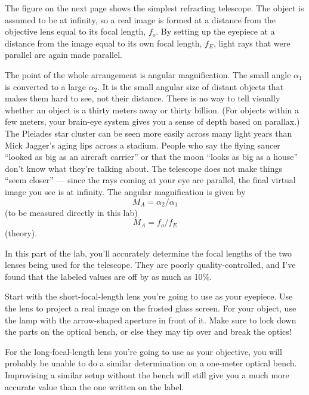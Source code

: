 \label{fig:telescope}

The figure on the next page
shows the simplest refracting telescope. The
object is assumed to be at infinity, so a real image is
formed at a distance from the objective lens equal to its
focal length, $f_o$. By setting up the eyepiece at a
distance from the image equal to its own focal length,
$f_E$, light rays that were parallel are again made parallel.

The point of the whole arrangement is angular magnification.
The small angle $\alpha_1$ is converted to a large
$\alpha_2$. It is the small angular size of distant objects
that makes them hard to see, not their distance. There is no
way to tell visually whether an object is a thirty meters
away or thirty billion. (For objects within a few meters,
your brain-eye system gives you a sense of depth based on
parallax.) The Pleiades star cluster can be seen more easily
across many light years than Mick Jagger's aging lips across
a stadium. People who say the flying saucer ``looked as big
as an aircraft carrier'' or that the moon ``looks as big as
a house'' don't know what they're talking about. The
telescope does not make things ``seem closer'' --- since the
rays coming at your eye are parallel, the final virtual
image you see is at infinity. The angular magnification is given by
\begin{equation*}
      M_A  =  \alpha_2/\alpha_1   
\end{equation*}
(to be measured directly in this lab)
\begin{equation*}
      M_A  =  f_o/f_E   
\end{equation*}
(theory).

\observations

In this part of the lab, you'll accurately determine the focal lengths of the two
lenses being used for the telescope. They are poorly quality-controlled, and I've
found that the labeled values are off by as much as 10\%.

Start with the short-focal-length lens you're going to use as your eyepiece.
Use the lens to project a real image on the
frosted glass screen. For your object, use the lamp with the
arrow-shaped aperture in front of it. Make sure to lock down
the parts on the optical bench, or else they may tip over
and break the optics!

For the long-focal-length lens you're going to use as your objective, you will
probably be unable to do a similar determination on a one-meter optical bench.
Improvising a similar setup without the bench will still give you a much more
accurate value than the one written on the label.

